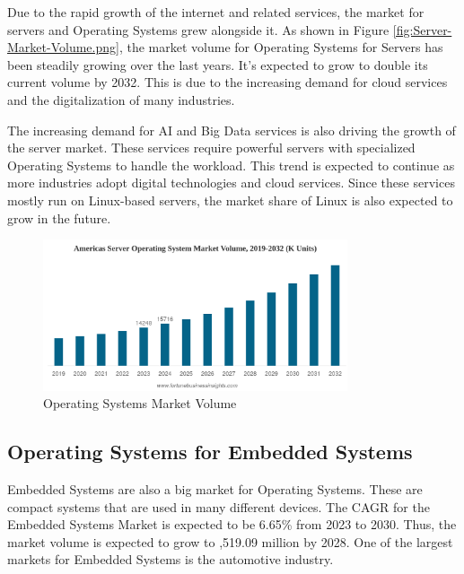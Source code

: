 Due to the rapid growth of the internet and related services, the market for servers and Operating Systems grew alongside it. 
As shown in Figure \ref{fig:Server-Market-Volume.png}, the market volume for Operating Systems for Servers has been steadily growing over the last years.
It's expected to grow to double its current volume by 2032. This is due to the increasing demand for cloud services and the digitalization of many industries.

The increasing demand for AI and Big Data services is also driving the growth of the server market. These services require powerful servers with specialized Operating Systems to handle the workload.
This trend is expected to continue as more industries adopt digital technologies and cloud services. Since these services mostly run on Linux-based servers, the market share of Linux is also expected to grow in the future.

\begin{figure}[H]
    \centering
    \includegraphics[width=0.8\textwidth]{figures/Server-Market-Volume.png}
    \caption{Operating Systems Market Volume}
    \label{fig:Operating_Systems_for_Servers_Market_Share}
\end{figure}

\cite{ServerOsMarketShare2}

\subsection{Operating Systems for Embedded Systems}

Embedded Systems are also a big market for Operating Systems. These are compact systems that are used in many different devices.
The CAGR for the Embedded Systems Market is expected to be 6.65\% from 2023 to 2030. Thus, the market volume is expected to grow to ,519.09 million by 2028.
One of the largest markets for Embedded Systems is the automotive industry. 

\cite{EmbeddedOsMarketShare}

